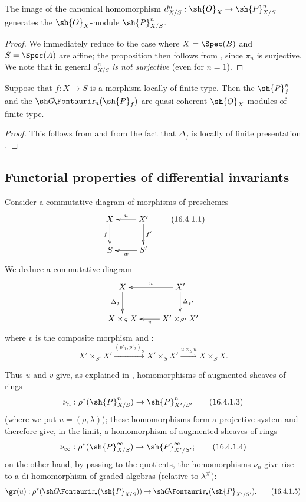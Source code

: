 \begin{proposition}[16.3.8]
\label{IV.16.3.8}
The image of the canonical homomorphism $d_{X/S}^n: \sh{O}_X \to \sh{P}_{X/S}^n$ generates the $\sh{O}_X$-module $\sh{P}_{X/S}^n$.
\end{proposition}

\begin{proof}
We immediately reduce to the case where $X=\Spec(B)$ and $S=\Spec(A)$ are affine; the proposition then follows from , since $\pi_n$ is surjective.
We note that in general $d_{X/S}^n$ \emph{is not surjective} (even for $n = 1$).
\end{proof}

\begin{proposition}[16.3.9]
\label{IV.16.3.9}
Suppose that $f:X \to S$ is a morphism locally of finite type.
Then the $\sh{P}_{f}^n$ and the $\shGr_n(\sh{P}_{f})$ are quasi-coherent $\sh{O}_X$-modules of finite type.
\end{proposition}

\begin{proof}
This follows from  and from the fact that $\Delta_f$ is locally of finite presentation .
\end{proof}

\subsection{Functorial properties of differential invariants}
\label{IV.16.4}

\begin{env}[16.4.1]
\label{IV.16.4.1}
Consider a commutative diagram of morphisms of preschemes
\[
  \label{IV.16.4.1.1}
  \xymatrix{
    X \ar[d]_-{f} & X' \ar[l]_-u \ar[d]^-{f'}\\
    S & S' \ar[l]^-w
  }
  \tag{16.4.1.1}
\]
We deduce a commutative diagram
\[
  \xymatrix{
    X \ar[d]_-{\Delta_f} & X' \ar[l]_-u \ar[d]^-{\Delta_{f'}}\\
    X \times_S X & X' \times_{S'} X' \ar[l]^-v
  }
\]
where $v$ is the composite morphism  and :
\[
  \label{IV.16.4.1.2}
  X' \times_{S'} X' \xrightarrow{(p'_1, p'_2)_S} X' \times_{S} X' \xrightarrow{u \times_S u} X \times_S X.
  \tag{16.4.1.2}
\]

Thus $u$ and $v$ give, as explained in , homomorphisms of augmented sheaves of rings
\[
  \label{IV.16.4.1.3}
  \nu_n: \rho^*(\sh{P}_{X/S}^n) \to \sh{P}_{X'/S'}^n
  \tag{16.4.1.3}
\]
(where we put $u = (\rho,\lambda)$);
these homomorphisms form a projective system and therefore give, in the limit, a homomorphism of augmented sheaves of rings
\[
  \label{IV.16.4.1.4}
  \nu_\infty: \rho^*(\sh{P}_{X/S}^\infty) \to \sh{P}_{X'/S'}^\infty;
  \tag{16.4.1.4}
\]
on the other hand, by passing to the quotients, the homomorphisms $\nu_n$ give rise to a di-homomorphism of graded algebras (relative to $\lambda^\#$):
\[
  \label{IV.16.4.1.5}
  \gr(u): \rho^*(\shGr_\bullet(\sh{P}_{X/S})) \to \shGr_\bullet(\sh{P}_{X'/S'}).
  \tag{16.4.1.5}
\]
\end{env}

